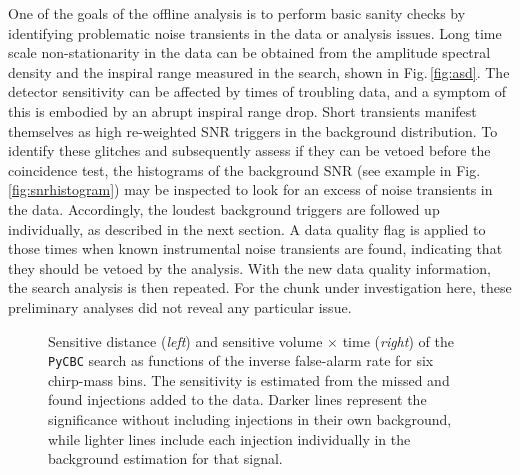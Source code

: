 \documentclass[binding=0.6cm, LaM]{sapthesis}
\begin{document}
	One of the goals of the offline analysis is to perform basic sanity checks 
	by identifying problematic noise transients in the data or analysis issues.
	Long time scale non-stationarity in the data can be obtained from the amplitude spectral density 
	and the inspiral range measured in the search, shown in Fig.\,\ref{fig:asd}.
	The detector sensitivity can be affected by times of troubling data, 
	and a symptom of this is embodied  by  an abrupt inspiral range drop.
	Short transients manifest themselves as high re-weighted SNR triggers in the background distribution. 
	To identify these glitches and subsequently  assess if they can be vetoed before the coincidence test, 
	the histograms of the background SNR (see example in Fig.\,\ref{fig:snrhistogram}) 
	may be inspected to look for an excess of noise transients in the data.
	Accordingly, the loudest background triggers are followed up individually, 
	as described in the next section.
	A data quality flag is applied to those times when known instrumental noise transients are found, 
	indicating that they should be vetoed by the analysis. 
	With the new data quality information, the search analysis is then repeated.  
        For the chunk under investigation here, these preliminary analyses did not reveal any particular issue.

        \begin{figure}[t]
          \noindent
          \label{sens_vt}
          \centering
          \caption{Sensitive distance (\textit{left}) and sensitive volume $\times$ time (\textit{right}) of the {\texttt{PyCBC}} search as functions of the inverse false-alarm rate for six chirp-mass bins. The sensitivity is estimated from the missed and found injections added to the data. Darker lines represent the significance without including injections in their own background, while lighter lines include each injection individually in the background estimation for that signal.}
          \label{fig:sens_vt}
        \end{figure}
\end{document}
